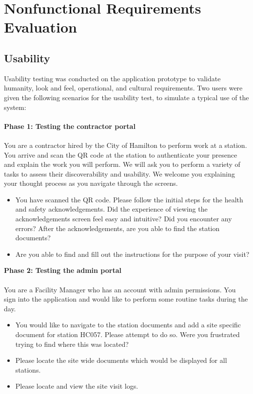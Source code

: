 \documentclass[12pt, titlepage]{article}
\begin{document}
\section{Nonfunctional Requirements Evaluation}

\subsection{Usability}
Usability testing was conducted on the application prototype to
validate humanity, look and feel, operational, and cultural requirements.
Two users were given the following scenarios for the usability test,
to simulate a typical use of the system:\\
\\
\textbf{Phase 1: Testing the contractor portal}
\\\\
You are a contractor hired by the City of Hamilton to perform work at a station.
You arrive and scan the QR code at the station to authenticate your
presence and explain the work you will perform.
We will ask you to perform a variety of tasks to assess their
discoverability and usability.
We welcome you explaining your thought process as you navigate
through the screens.
\begin{itemize}
  \item You have scanned the QR code. Please follow the initial steps
    for the health and safety acknowledgements. Did the experience of
    viewing the acknowledgements screen feel easy and intuitive? Did
    you encounter any errors?
    After the acknowledgements, are you able to find the station documents?
  \item Are you able to find and fill out the instructions for the
    purpose of your visit?
\end{itemize}
\textbf{Phase 2: Testing the admin portal}
\\\\
You are a Facility Manager who has an account with admin permissions.
You sign into the application and would like to perform some routine
tasks during the day.
\begin{itemize}
  \item You would like to navigate to the station documents and add a
    site specific document for station HC057. Please attempt to do
    so. Were you frustrated trying to find where this was located?
  \item Please locate the site wide documents which would be
    displayed for all stations.
  \item Please locate and view the site visit logs.
\end{itemize}
\end{document}
